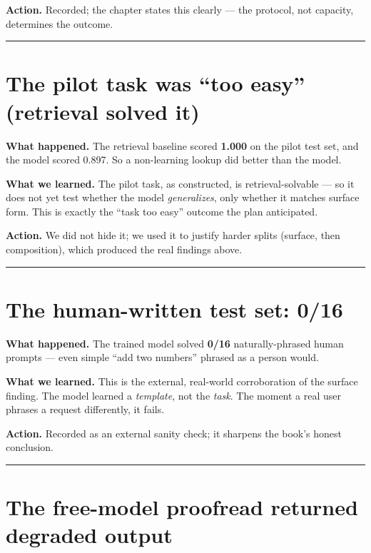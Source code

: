 \textbf{Action.} Recorded; the chapter states this clearly --- the
protocol, not capacity, determines the outcome.

\begin{center}\rule{0.5\linewidth}{0.5pt}\end{center}

\section{The pilot task was ``too easy'' (retrieval solved
it)}\label{the-pilot-task-was-too-easy-retrieval-solved-it}

\textbf{What happened.} The retrieval baseline scored \textbf{1.000} on
the pilot test set, and the model scored 0.897. So a non-learning lookup
did better than the model.

\textbf{What we learned.} The pilot task, as constructed, is
retrieval-solvable --- so it does not yet test whether the model
\emph{generalizes}, only whether it matches surface form. This is
exactly the ``task too easy'' outcome the plan anticipated.

\textbf{Action.} We did not hide it; we used it to justify harder splits
(surface, then composition), which produced the real findings above.

\begin{center}\rule{0.5\linewidth}{0.5pt}\end{center}

\section{The human-written test set:
0/16}\label{the-human-written-test-set-016}

\textbf{What happened.} The trained model solved \textbf{0/16}
naturally-phrased human prompts --- even simple ``add two numbers''
phrased as a person would.

\textbf{What we learned.} This is the external, real-world corroboration
of the surface finding. The model learned a \emph{template}, not the
\emph{task}. The moment a real user phrases a request differently, it
fails.

\textbf{Action.} Recorded as an external sanity check; it sharpens the
book's honest conclusion.

\begin{center}\rule{0.5\linewidth}{0.5pt}\end{center}

\section{The free-model proofread returned degraded
output}\label{the-free-model-proofread-returned-degraded-output}

